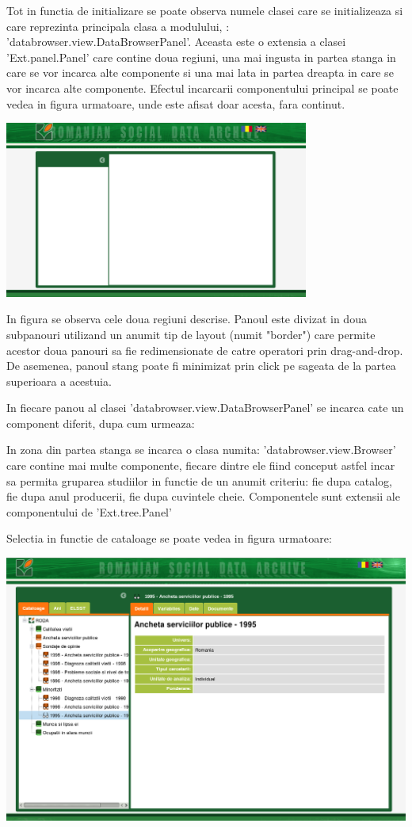 Tot in functia de initializare se poate observa numele clasei care se initializeaza si care reprezinta principala clasa a modulului, : 'databrowser.view.DataBrowserPanel'. Aceasta este o extensia a clasei 'Ext.panel.Panel' care contine doua regiuni, una mai ingusta in partea stanga in care se vor incarca alte componente si una mai lata in partea dreapta in care se vor incarca alte componente. Efectul incarcarii componentului principal se poate vedea in figura urmatoare, unde este afisat doar acesta, fara continut. 

\includegraphics[width=10cm]{img/db-empty}

In figura se observa cele doua regiuni descrise. Panoul este divizat in doua subpanouri utilizand un anumit tip de layout (numit "border") care permite acestor doua panouri sa  fie redimensionate de catre operatori prin drag-and-drop. De asemenea, panoul stang poate fi minimizat prin click pe sageata de la partea superioara a acestuia. 

In fiecare panou al clasei 'databrowser.view.DataBrowserPanel' se incarca cate un component diferit, dupa cum urmeaza: 

In zona din partea stanga se incarca o clasa numita: 'databrowser.view.Browser' care contine mai multe componente, fiecare dintre ele fiind conceput astfel incar sa permita gruparea studiilor in functie de un anumit criteriu: fie dupa catalog, fie dupa anul producerii, fie dupa cuvintele cheie. Componentele sunt extensii ale componentului de 'Ext.tree.Panel' 

Selectia in functie de cataloage se poate vedea in figura urmatoare:


\includegraphics[width=16cm]{img/db-catalog}


